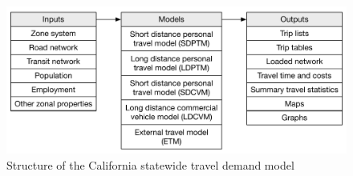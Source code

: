 \begin{figure}  %
\centering
\includegraphics[scale=0.6]{graphics/53-cstdm2-structure}
\caption{Structure of the California statewide travel demand model}
\label{fig:cstdm2-structure}
\end{figure}

